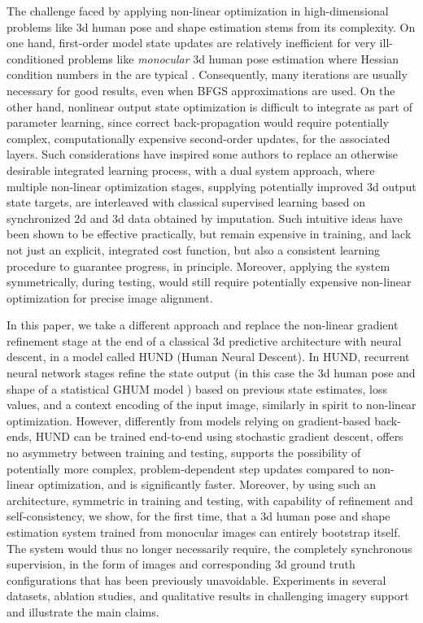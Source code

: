 \documentclass[final]{cvpr}
\begin{document}
The challenge faced by applying non-linear optimization in high-dimensional problems like 3d human pose and shape estimation stems from its complexity. On one hand, first-order model state updates are relatively inefficient for very ill-conditioned problems like \emph{monocular} 3d human pose estimation where Hessian condition numbers in the  are typical \cite{sminchisescu_ijrr03}. Consequently, many iterations are usually necessary for good results, even when BFGS approximations are used. On the other hand, nonlinear output state optimization is difficult to integrate as part of parameter learning, since correct back-propagation would require potentially complex, computationally expensive second-order updates, for the associated layers. Such considerations have inspired some authors \cite{kolotouros2019learning} to replace an otherwise desirable integrated learning process, with a dual system approach, where multiple non-linear optimization stages, supplying potentially improved 3d output state targets, are interleaved with classical supervised learning based on synchronized 2d and 3d data obtained by imputation. Such intuitive ideas have been shown to be effective practically, but remain expensive in training, and lack not just an explicit, integrated cost function, but also a consistent learning procedure to guarantee progress, in principle. Moreover, applying the system symmetrically, during testing, would still require potentially expensive non-linear optimization for precise image alignment. 

In this paper, we take a different approach and replace the non-linear gradient refinement stage at the end of a classical 3d predictive architecture with neural descent, in a model called HUND (Human Neural Descent). In HUND, recurrent neural network stages refine the state output (in this case the 3d human pose and shape of a statistical GHUM model \cite{ghum2020}) based on previous state estimates, loss values, and a context encoding of the input image, similarly in spirit to non-linear optimization. However, differently from models relying on gradient-based back-ends, HUND can be trained end-to-end using stochastic gradient descent, offers no asymmetry between training and testing, supports the possibility of potentially more complex, problem-dependent step updates compared to non-linear optimization, and is significantly faster. Moreover, by using such an architecture, symmetric in training and testing, with capability of refinement and self-consistency, we show, for the first time, that a 3d human pose and shape estimation system trained from monocular images can entirely bootstrap itself. The system would thus no longer necessarily require, the completely synchronous supervision, in the form of images and corresponding 3d ground truth configurations that has been previously unavoidable. Experiments in several datasets, ablation studies, and qualitative results in challenging imagery support and illustrate the main claims.
\end{document}
